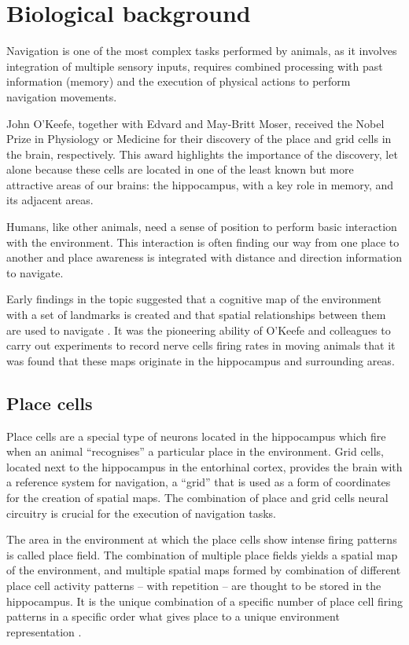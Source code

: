 \section{Biological background}

Navigation is one of the most complex tasks performed by animals, as it involves integration of multiple sensory inputs, requires combined processing with past information (memory) and the execution of physical actions to perform navigation movements.

John O'Keefe, together with Edvard and May-Britt Moser, received the Nobel Prize in Physiology or Medicine for their discovery of the place and grid cells in the brain, respectively. This award highlights the importance of the discovery, let alone because these cells are located in one of the least known but more attractive areas of our brains: the hippocampus, with a key role in memory, and its adjacent areas.

Humans, like other animals, need a sense of position to perform basic interaction with the environment. This interaction is often finding our way from one place to another and place awareness is integrated with distance and direction information to navigate.

Early findings in the topic suggested that a cognitive map of the environment with a set of landmarks is created and that spatial relationships between them are used to navigate \cite{keefe1978hippocampus}. It was the pioneering ability of O'Keefe and colleagues to carry out experiments to record nerve cells firing rates in moving animals that it was found that these maps originate in the hippocampus and surrounding areas.

\subsection{Place cells}


Place cells are a special type of neurons located in the hippocampus which fire when an animal ``recognises'' a particular place in the environment. Grid cells, located next to the hippocampus in the entorhinal cortex, provides the brain with a reference system for navigation, a ``grid'' that is used as a form of coordinates for the creation of spatial maps. The combination of place and grid cells neural circuitry is crucial for the execution of navigation tasks.

The area in the environment at which the place cells show intense firing patterns is called place field. The combination of multiple place fields yields a spatial map of the environment, and multiple spatial maps formed by combination of different place cell activity patterns -- with repetition -- are thought to be stored in the hippocampus. It is the unique combination of a specific number of place cell firing patterns in a specific order what gives place to a unique environment representation \cite{okeefe1971hippocampus}.

